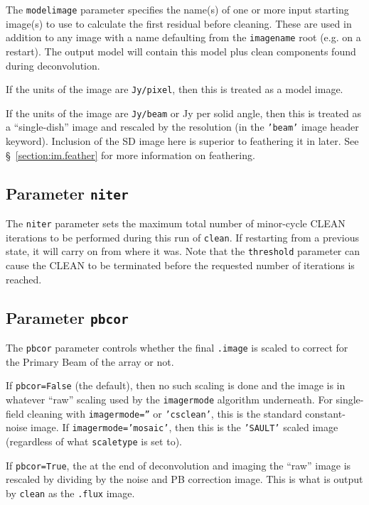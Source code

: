 The {\tt modelimage} parameter specifies the name(s) of one or more
input starting image(s) to use to calculate the first residual before
cleaning.  These are used in addition to any image with a name
defaulting from the {\tt imagename} root (e.g. on a restart).
The output model will contain this model plus
clean components found during deconvolution.  

If the units of the image are {\tt Jy/pixel}, then this is treated
as a model image.

If the units of the image are {\tt Jy/beam} or Jy per solid angle,
then this is treated as a ``single-dish'' image and rescaled by
the resolution (in the {\tt 'beam'} image header keyword). Inclusion
of the SD image here is superior to feathering it in later.
See \S~\ref{section:im.feather} for more information on feathering.

\subsection{Parameter {\tt niter} }
\label{section:im.clean.niter}

The {\tt niter} parameter sets the maximum total number of minor-cycle CLEAN
iterations to be performed during this run of {\tt clean}.  If restarting
from a previous state, it will carry on from where it was.  Note that
the {\tt threshold} parameter can cause the CLEAN to be terminated before
the requested number of iterations is reached.

\subsection{Parameter {\tt pbcor} }
\label{section:im.clean.pbcor}

The {\tt pbcor} parameter controls whether the final {\tt .image} 
is scaled to correct for the Primary Beam of the array or not.

If {\tt pbcor=False} (the default), then no such scaling is done
and the image is in whatever ``raw'' scaling used by the 
{\tt imagermode} algorithm underneath.  For single-field cleaning
with {\tt imagermode=''} or {\tt 'csclean'}, this is the standard
constant-noise image.  If {\tt imagermode='mosaic'}, then this is
the {\tt 'SAULT'} scaled image (regardless of what {\tt scaletype}
is set to).

If {\tt pbcor=True}, the at the end of deconvolution and imaging the
``raw'' image is rescaled by dividing by the noise and PB correction
image.  This is what is output by {\tt clean} as the {\tt .flux}
image.  

